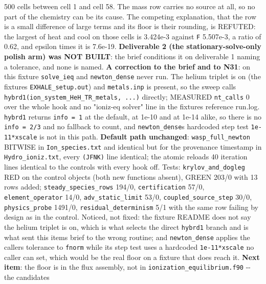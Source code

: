 \documentclass[english,a4paper]{my_memo}
\begin{document}
\begin{itemize}
  500 cells between cell 1 and cell 58. The mass row carries no source at
  all, so no part of the chemistry can be its cause. The competing
  explanation, that the row is a small difference of large terms and its
  floor is their rounding, is REFUTED: the largest of heat and cool on
  those cells is 3.424e-3 against \texttt{\textbar{}\textbar{}F\textbar{}\textbar{}} 5.507e-3, a ratio of 0.62, and
  epsilon times it is 7.6e-19. \textbf{Deliverable 2 (the stationary-solve-only
  polish arm) was NOT BUILT}: the brief conditions it on deliverable 1
  naming a tolerance, and none is named. \textbf{A correction to the brief and
  to N31}: on this fixture \texttt{solve\_ieq} and \texttt{newton\_dense} never run.
  The helium triplet is on (the fixture\textquotesingle s \texttt{EXHALE\_setup.out}) and
  \texttt{metals.inp} is present, so the sweep calls
  \texttt{hybrd1(ion\_system\_HeH\_TR\_metals,\ ...)} directly; MEASURED \texttt{nt\_calls} 0
  over the whole hook and no "ioniz-eq solver" line in the fixture\textquotesingle s
  reference run.log. \texttt{hybrd1} returns \texttt{info\ =\ 1} at the default, at 1e-10
  and at 1e-14 alike, so there is no \texttt{info\ =\ 2/3} and no fallback to
  count, and \texttt{newton\_dense}\textquotesingle s hardcoded step test \texttt{1e-11*xscale} is not in
  this path. \textbf{Default path unchanged}: \texttt{wasp\_full\_newton} BITWISE in
  \texttt{Ion\_species.txt} and identical but for the provenance timestamp in
  \texttt{Hydro\_ioniz.txt}, every \texttt{(JFNK)} line identical; the atomic reload\textquotesingle s 40
  iteration lines identical to the control\textquotesingle s with every hook off. Tests:
  \texttt{krylov\_and\_dogleg} RED on the control objects (both new functions
  absent), GREEN 203/0 with 13 rows added; \texttt{steady\_species\_rows} 194/0,
  \texttt{certification} 57/0, \texttt{element\_operator} 14/0, \texttt{adv\_static\_limit} 53/0,
  \texttt{coupled\_source\_step} 30/0, \texttt{physics\_probe} 1491/0,
  \texttt{residual\_determinism} 5/1 with the same row failing by design as in the
  control. Noticed, not fixed: the fixture README does not say the helium
  triplet is on, which is what selects the direct \texttt{hybrd1} branch and is
  what sent this item\textquotesingle s brief to the wrong routine; and \texttt{newton\_dense}
  applies the caller\textquotesingle s tolerance to \texttt{fnorm} while its step test uses a
  hardcoded \texttt{1e-11*xscale} no caller can set, which would be the real
  floor on a fixture that does reach it. \textbf{Next item}: the floor is in
  the flux assembly, not in \texttt{ionization\_equilibrium.f90} -\/- the candidates

\end{itemize}
\end{document}
